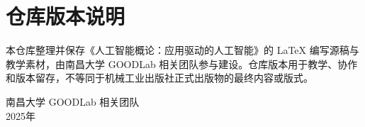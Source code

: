 \chapter*{仓库版本说明}

本仓库整理并保存《人工智能概论：应用驱动的人工智能》的 LaTeX 编写源稿与教学素材，由南昌大学 GOODLab 相关团队参与建设。仓库版本用于教学、协作和版本留存，不等同于机械工业出版社正式出版物的最终内容或版式。

\begin{flushright}
    南昌大学 GOODLab 相关团队\\
    2025年
\end{flushright}
